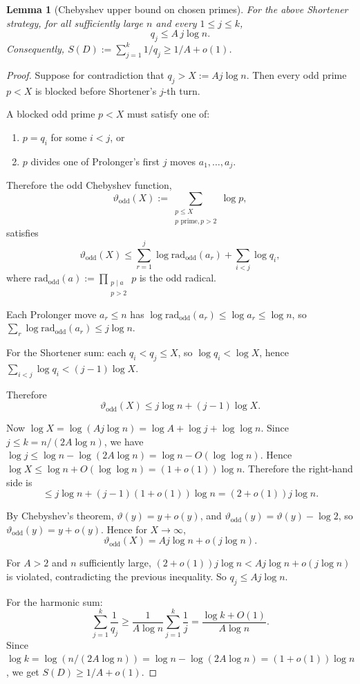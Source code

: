 \documentclass{article}
\newtheorem{lemma}{Lemma}
\begin{document}
\begin{lemma}[Chebyshev upper bound on chosen primes]
\label{lem:prime-bound-v2}
For the above Shortener strategy, for all sufficiently large $n$ and every $1 \le j \le k$,
\[
q_j \le A\, j \log n.
\]
Consequently, $S(D) := \sum_{j=1}^{k} 1/q_j \ge 1/A + o(1)$.
\end{lemma}

\begin{proof}
Suppose for contradiction that $q_j > X := A j \log n$. Then every odd prime $p < X$ is blocked before Shortener's $j$-th turn.

A blocked odd prime $p < X$ must satisfy one of:
\begin{enumerate}
  \item $p = q_i$ for some $i < j$, or
  \item $p$ divides one of Prolonger's first $j$ moves $a_1, \ldots, a_j$.
\end{enumerate}

Therefore the odd Chebyshev function,
\[
\vartheta_{\mathrm{odd}}(X) := \sum_{\substack{p \le X \\ p \text{ prime}, p > 2}} \log p,
\]
satisfies
\[
\vartheta_{\mathrm{odd}}(X) \le \sum_{r=1}^{j} \log \mathrm{rad}_{\mathrm{odd}}(a_r) + \sum_{i < j} \log q_i,
\]
where $\mathrm{rad}_{\mathrm{odd}}(a) := \prod_{\substack{p \mid a \\ p > 2}} p$ is the odd radical.

Each Prolonger move $a_r \le n$ has $\log \mathrm{rad}_{\mathrm{odd}}(a_r) \le \log a_r \le \log n$, so $\sum_r \log \mathrm{rad}_{\mathrm{odd}}(a_r) \le j \log n$.

For the Shortener sum: each $q_i < q_j \le X$, so $\log q_i < \log X$, hence $\sum_{i<j} \log q_i < (j-1) \log X$.

Therefore
\[
\vartheta_{\mathrm{odd}}(X) \le j \log n + (j-1) \log X.
\]

Now $\log X = \log(A j \log n) = \log A + \log j + \log\log n$. Since $j \le k = n/(2 A \log n)$, we have $\log j \le \log n - \log(2 A \log n) = \log n - O(\log\log n)$. Hence $\log X \le \log n + O(\log\log n) = (1 + o(1)) \log n$. Therefore the right-hand side is
\[
\le j \log n + (j-1) (1 + o(1)) \log n = (2 + o(1)) j \log n.
\]

By Chebyshev's theorem, $\vartheta(y) = y + o(y)$, and $\vartheta_{\mathrm{odd}}(y) = \vartheta(y) - \log 2$, so $\vartheta_{\mathrm{odd}}(y) = y + o(y)$. Hence for $X \to \infty$,
\[
\vartheta_{\mathrm{odd}}(X) = A j \log n + o(j \log n).
\]

For $A > 2$ and $n$ sufficiently large, $(2 + o(1)) j \log n < A j \log n + o(j \log n)$ is violated, contradicting the previous inequality. So $q_j \le A j \log n$.

For the harmonic sum:
\[
\sum_{j=1}^{k} \frac{1}{q_j} \ge \frac{1}{A \log n} \sum_{j=1}^{k} \frac{1}{j} = \frac{\log k + O(1)}{A \log n}.
\]
Since $\log k = \log(n / (2 A \log n)) = \log n - \log(2 A \log n) = (1 + o(1)) \log n$, we get $S(D) \ge 1/A + o(1)$.
\end{proof}
\end{document}
